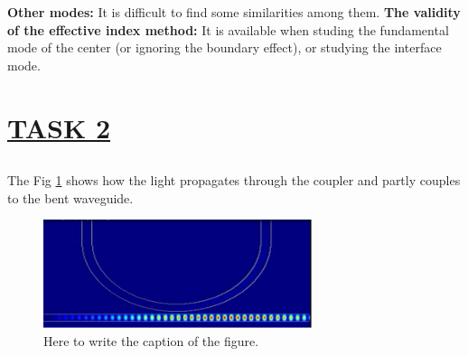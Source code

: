 \documentclass[fontsize=11pt]{scrartcl}
\begin{document}
\textbf{Other modes:} It is difficult to find some similarities among them.
\textbf{The validity of the effective index method:}
It is available when studing the fundamental mode of the center 
(or ignoring the boundary effect), or studying the interface mode.
\pagebreak
\section{\uline{TASK 2}}
\subsection{}
The Fig \ref{fig2.1} shows how the light propagates through the coupler and partly couples 
to the bent waveguide. 
\begin{figure}[H]
    \centering
     \includegraphics[width=0.7\textwidth]{img/fig2.1.png}
     \caption{Here to write the caption of the figure.}
     \label{fig2.1}
\end{figure} 
\end{document}
